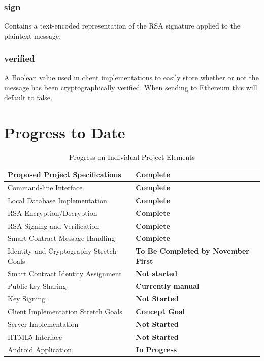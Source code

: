 \documentclass[titlepage]{report}
\begin{document}
\subsubsection{sign}
Contains a text-encoded representation of the RSA signature applied to the plaintext message.

\subsubsection{verified}
A Boolean value used in client implementations to easily store whether or not the message has been cryptographically verified. When sending to \gls{Ethereum} this will default to false.

\pagebreak

\section{Progress to Date}

\begin{table}[ht]
\begin{center}
\caption{Progress on Individual Project Elements}
\begin{tabular}{| l | p{5cm} |}
\hline
Proposed Project Specifications & \textbf{Complete} \\
\hline
Command-line Interface & \textbf{Complete} \\
Local Database Implementation & \textbf{Complete} \\
RSA\index{RSA} Encryption/Decryption & \textbf{Complete} \\
RSA\index{RSA} Signing and Verification & \textbf{Complete} \\
Smart Contract Message Handling & \textbf{Complete} \\
\hline
Identity and Cryptography Stretch Goals & \textbf{To Be Completed by November First} \\
\hline
Smart Contract Identity Assignment & \textbf{Not started} \\
Public-key Sharing & \textbf{Currently manual} \\
Key Signing & \textbf{Not Started} \\
\hline
Client Implementation Stretch Goals & \textbf{Concept Goal} \\
\hline
Server Implementation & \textbf{Not Started} \\
HTML5 Interface & \textbf{Not Started} \\
Android Application & \textbf{In Progress} \\
\hline
\end{tabular}
\end{center}
\end{table}

\listoftables
\listoffigures
\printindex
\printglossaries{}
\printbibliography{}
\end{document}
